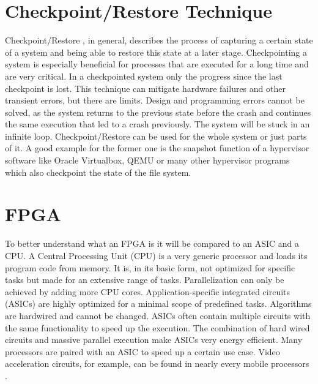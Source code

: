 \section{Checkpoint/Restore Technique}
Checkpoint/Restore \cite{carnegie_checkpoint-restore}, in general, describes the process of 
capturing a certain state of a system and being able
to restore this state at a later stage. 
Checkpointing a system is especially beneficial for processes
that are executed for a long time and are very critical.
In a checkpointed system only the progress since the last
checkpoint is lost.
This technique can mitigate hardware failures and other transient
errors, but there are limits.
Design and programming errors cannot be solved, as the system
returns to the previous state before the crash and
continues the same execution that led to a crash previously.
The system will be stuck in an infinite loop.
Checkpoint/Restore can be used for the whole system or just
parts of it. A good example for the former one is the 
snapshot function of a hypervisor software like
Oracle Virtualbox, QEMU or many other hypervisor programs
which also checkpoint the state of the file system.

\section{FPGA}
To better understand what an FPGA is it will be compared to an ASIC
and a CPU. A Central Processing Unit (CPU) is a very generic
processor and loads its program code from memory.
It is, in its basic form, not optimized for specific tasks
but made for an extensive range of tasks. Parallelization can
only be achieved by adding more CPU cores.
Application-specific integrated circuits (ASICs) are highly
optimized for a minimal scope of predefined tasks.
Algorithms are hardwired and cannot be changed. ASICs
often contain multiple circuits with the same functionality
to speed up the execution. The combination of hard wired
circuits and massive parallel execution make ASICs very
energy efficient. Many processors are paired with an ASIC
to speed up a certain use case. Video acceleration
circuits, for example, can be found in nearly every mobile
processors \cite{arm_gpu_hevc}.

